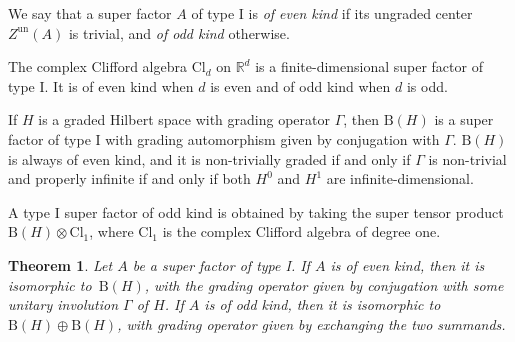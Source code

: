 \documentclass[10pt,a4paper]{amsart}
\numberwithin{equation}{section}
\newtheorem{Theorem}{Theorem}[section]
\newcommand{\R}{\mathbb{R}}
\newcommand{\B}{\mathrm{B}}
\newcommand{\Cl}{\mathrm{Cl}}
\begin{document}
\begin{Definition}
We say that a super factor $A$ of type I is \emph{of even kind} if its ungraded center $Z^{\mathrm{un}}(A)$ is trivial, and \emph{of odd kind} otherwise.	
\end{Definition}

\begin{Example} \label{ExampleFiniteDimensional}
 The complex Clifford algebra $\Cl_d$ on $\R^d$ is a finite-dimensional super factor of type I.
 It is of even kind when $d$ is even and of odd kind when $d$ is odd.
\end{Example}

\begin{Example} \label{ExampleOddKind}
If $H$ is a graded Hilbert space with grading operator $\Gamma$, then $\B(H)$ is a super factor of type I with grading automorphism given by conjugation with $\Gamma$.
$\B(H)$ is always of even kind, and it is non-trivially graded if and only if $\Gamma$ is non-trivial and properly infinite if and only if both $H^0$ and $H^1$ are infinite-dimensional.
\end{Example}

\begin{Example} \label{ExampleEvenKind}
A type I super factor of odd kind is obtained by taking the super tensor product~${\B(H) \otimes \Cl_1}$, where $\Cl_1$ is the complex Clifford algebra of degree one.
\end{Example}


\begin{Theorem}
\label{ThmClassificationSuperFactorI}
Let $A$ be a super factor of type I.
If $A$ is of even kind, then it is isomorphic to~$\B(H)$, with the grading operator given by conjugation with some unitary involution $\Gamma$ of $H$.
If $A$ is of odd kind, then it is isomorphic to $\B(H) \oplus \B(H)$, with grading operator given by exchanging the two summands.
\end{Theorem}
\end{document}
